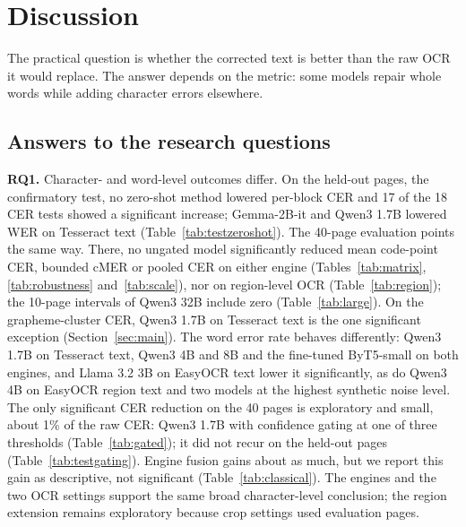 \documentclass[conference]{IEEEtran}
\begin{document}


\section{Discussion}
\label{sec:discussion}

The practical question is whether the corrected text is better than the raw OCR it would replace. The answer depends on the metric: some models repair whole words while adding character errors elsewhere.

\subsection{Answers to the research questions}
\textbf{RQ1.} Character- and word-level outcomes differ. On the held-out pages, the confirmatory test, no zero-shot method lowered per-block CER and 17 of the 18 CER tests showed a significant increase; Gemma-2B-it and Qwen3 1.7B lowered WER on Tesseract text (Table~\ref{tab:testzeroshot}). The 40-page evaluation points the same way. There, no ungated model significantly reduced mean code-point CER, bounded cMER or pooled CER on either engine (Tables~\ref{tab:matrix}, \ref{tab:robustness} and~\ref{tab:scale}), nor on region-level OCR (Table~\ref{tab:region}); the 10-page intervals of Qwen3 32B include zero (Table~\ref{tab:large}). On the grapheme-cluster CER, Qwen3 1.7B on Tesseract text is the one significant exception (Section~\ref{sec:main}). The word error rate behaves differently: Qwen3 1.7B on Tesseract text, Qwen3 4B and 8B and the fine-tuned ByT5-small on both engines, and Llama 3.2 3B on EasyOCR text lower it significantly, as do Qwen3 4B on EasyOCR region text and two models at the highest synthetic noise level. The only significant CER reduction on the 40 pages is exploratory and small, about 1\% of the raw CER: Qwen3 1.7B with confidence gating at one of three thresholds (Table~\ref{tab:gated}); it did not recur on the held-out pages (Table~\ref{tab:testgating}). Engine fusion gains about as much, but we report this gain as descriptive, not significant (Table~\ref{tab:classical}). The engines and the two OCR settings support the same broad character-level conclusion; the region extension remains exploratory because crop settings used evaluation pages.
\end{document}
